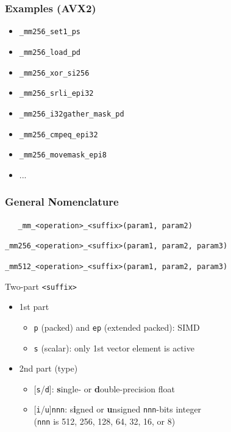\documentclass[xcolor={x11names,svgnames}]{beamer}
\begin{document}

\begin{frame}[fragile=singleslide]
  \frametitle{Examples (AVX2)}

  \begin{itemize}
  \item \texttt{_mm256_set1_ps}
  \item \texttt{_mm256_load_pd}
  \item \texttt{_mm256_xor_si256}
  \item \texttt{_mm256_srli_epi32}
  \item \texttt{_mm256_i32gather_mask_pd}
  \item \texttt{_mm256_cmpeq_epi32}
  \item \texttt{_mm256_movemask_epi8}
  \item ...
  \end{itemize}
\end{frame}


\begin{frame}[fragile=singleslide]
  \frametitle{General Nomenclature}

  \begin{center}
    \verb|   _mm_<operation>_<suffix>(param1, param2)        |
    
    \verb|_mm256_<operation>_<suffix>(param1, param2, param3)|

    \verb|_mm512_<operation>_<suffix>(param1, param2, param3)|
  \end{center}

  \begin{block}{Two-part \texttt{<suffix>}}
    \begin{itemize}
    \item 1st part
      \begin{itemize}
      \item \texttt{p} (packed) and \texttt{ep} (extended packed): SIMD
      \item \texttt{s} (scalar): only 1st vector element is active 
      \end{itemize}

    
  \item 2nd part (type)
    \begin{itemize}
    \item{}  [\texttt{s}/\texttt{d}]: \textbf{s}ingle- or \textbf{d}ouble-precision float
    \item{} [\texttt{i}/\texttt{u}]\texttt{nnn}: s\textbf{i}gned or \textbf{u}nsigned \texttt{nnn}-bits integer \\ (\texttt{nnn} is 512, 256, 128, 64, 32, 16, or 8)
    \end{itemize}
  \end{itemize}
\end{block}
\end{frame}
\end{document}

